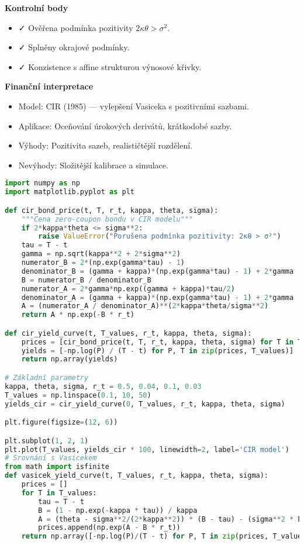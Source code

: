 \begin{example}
\noindent\textbf{Kontrolní body}
\begin{itemize}
\item ✓ Ověřena podmínka pozitivity $2\kappa\theta > \sigma^2$.
\item ✓ Splněny okrajové podmínky.
\item ✓ Konzistence s affine strukturou výnosové křivky.
\end{itemize}

\noindent\textbf{Finanční interpretace}
\begin{itemize}
\item Model: CIR (1985) — vylepšení Vasiceka s pozitivními sazbami.
\item Aplikace: Oceňování úrokových derivátů, krátkodobé sazby.
\item Výhody: Pozitivita sazeb, realističtější rozdělení.
\item Nevýhody: Složitější kalibrace a simulace.
\end{itemize}

\begin{lstlisting}[language=Python, caption={Implementace CIR modelu v Pythonu}]
import numpy as np
import matplotlib.pyplot as plt

def cir_bond_price(t, T, r_t, kappa, theta, sigma):
    """Cena zero-coupon bondu v CIR modelu"""
    if 2*kappa*theta <= sigma**2:
        raise ValueError("Porušena podmínka pozitivity: 2κθ > σ²")
    tau = T - t
    gamma = np.sqrt(kappa**2 + 2*sigma**2)
    numerator_B = 2*(np.exp(gamma*tau) - 1)
    denominator_B = (gamma + kappa)*(np.exp(gamma*tau) - 1) + 2*gamma
    B = numerator_B / denominator_B
    numerator_A = 2*gamma*np.exp((gamma + kappa)*tau/2)
    denominator_A = (gamma + kappa)*(np.exp(gamma*tau) - 1) + 2*gamma
    A = (numerator_A / denominator_A)**(2*kappa*theta/sigma**2)
    return A * np.exp(-B * r_t)

def cir_yield_curve(t, T_values, r_t, kappa, theta, sigma):
    prices = [cir_bond_price(t, T, r_t, kappa, theta, sigma) for T in T_values]
    yields = [-np.log(P) / (T - t) for P, T in zip(prices, T_values)]
    return np.array(yields)

# Základní parametry
kappa, theta, sigma, r_t = 0.5, 0.04, 0.1, 0.03
T_values = np.linspace(0.1, 10, 50)
yields_cir = cir_yield_curve(0, T_values, r_t, kappa, theta, sigma)

plt.figure(figsize=(12, 6))

plt.subplot(1, 2, 1)
plt.plot(T_values, yields_cir * 100, linewidth=2, label='CIR model')
# Srovnání s Vasicekem
from math import isfinite
def vasicek_yield_curve(t, T_values, r_t, kappa, theta, sigma):
    prices = []
    for T in T_values:
        tau = T - t
        B = (1 - np.exp(-kappa * tau)) / kappa
        A = (theta - sigma**2/(2*kappa**2)) * (B - tau) - (sigma**2 * B**2)/(4*kappa)
        prices.append(np.exp(A - B * r_t))
    return np.array([-np.log(P)/(T - t) for P, T in zip(prices, T_values)])


\end{lstlisting}
\end{example}
